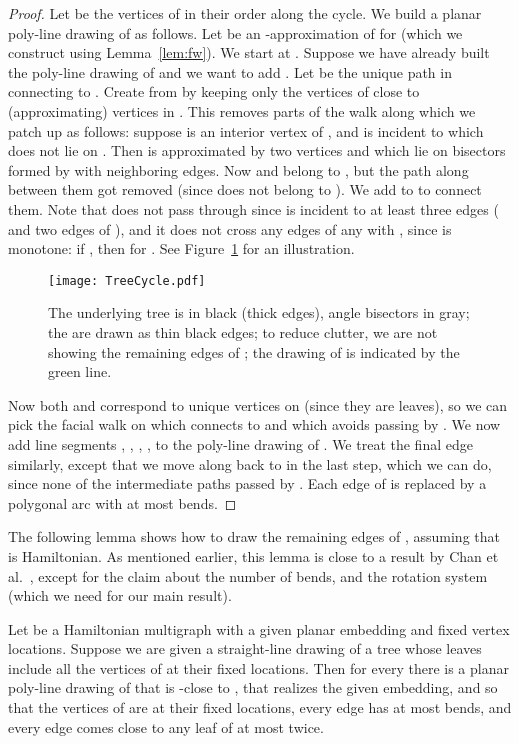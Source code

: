 \documentclass{llncs}
\begin{document}
\begin{proof}
 Let  be the vertices of  in their order along the cycle. We build a planar poly-line drawing of  as follows. Let  be an -approximation of  for  (which we construct using Lemma~\ref{lem:fw}). We start at . Suppose we have already built the poly-line drawing of  and we want to add . Let  be the unique path in  connecting   to . Create  from  by keeping only the vertices of  close to (approximating)
 vertices in .
 This removes parts of the walk along  which we patch up as follows: suppose  is an interior vertex of , and
  is incident to  which does not lie on . Then  is approximated by two vertices  and  which lie on bisectors formed by  with neighboring edges. Now  and  belong to , but the path along  between them got removed (since  does not belong to ). We
 add  to  to connect them. Note that  does not pass through  since  is incident to at least three edges ( and two edges of ), and it does not cross any edges of any  with , since  is monotone: if , then  for . See Figure~\ref{fig:treecycle} for an illustration.
\begin{figure}[tb]
\centering
\texttt{[image: TreeCycle.pdf]}
\caption{The underlying tree  is in black (thick edges), angle bisectors in gray; the  are drawn as thin black edges; to reduce clutter, we are not showing the remaining edges of ; the drawing of  is indicated by the green line.}
\label{fig:treecycle}
\end{figure}
Now both  and  correspond to unique vertices on  (since they are leaves), so we can pick the facial walk  on  which connects  to  and which avoids passing by . We now add line segments
 , , , ,  to the
 poly-line drawing of . We treat the final edge  similarly, except that we move along  back to  in the last step,
 which we can do, since none of the intermediate paths passed by . Each edge of  is replaced by a polygonal arc with at most  bends.
\end{proof}

The following lemma shows how to draw the remaining edges of , assuming that  is Hamiltonian. As mentioned earlier, this lemma is close to a result by Chan et al.~\cite{CHKL13}, except for the claim about the number of bends, and the rotation system (which we need for our main result).

\begin{lemma}\label{lem:Te}
Let  be a Hamiltonian multigraph with a given planar embedding and fixed vertex locations. Suppose we are given a straight-line drawing of a tree  whose leaves include all the vertices of  at their fixed locations. Then for every  there is a planar poly-line drawing of  that is -close to , that realizes the given embedding, and so that the vertices of  are at their fixed locations, every edge has at most  bends, and every edge comes close to any leaf of  at most twice.
\end{lemma}
\end{document}
